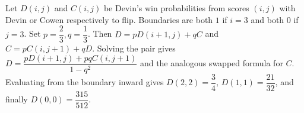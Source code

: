 Let $D(i,j)$ and $C(i,j)$ be Devin's win probabilities from scores $(i,j)$ with Devin or Cowen respectively to flip. Boundaries are both $1$ if $i=3$ and both $0$ if $j=3$. Set $p=\dfrac{2}{3},q=\dfrac{1}{3}$. Then $D=pD(i+1,j)+qC$ and $C=pC(i,j+1)+qD$. Solving the pair gives $D=\dfrac{pD(i+1,j)+pqC(i,j+1)}{1-q^2}$ and the analogous swapped formula for $C$. Evaluating from the boundary inward gives $D(2,2)=\dfrac{3}{4}$, $D(1,1)=\dfrac{21}{32}$, and finally $\boxed{D(0,0)=\dfrac{315}{512}}$.
